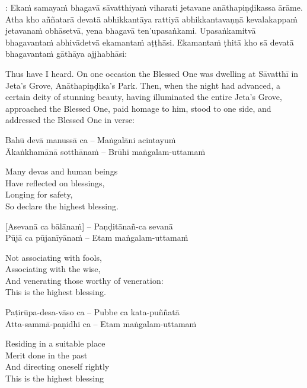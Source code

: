 \begin{pali-hang}
: Ekaṁ samayaṁ bhagavā sāvatthiyaṁ viharati jetavane anāthapiṇḍikassa ārāme. Atha kho aññatarā devatā abhikkantāya rattiyā abhikkantavaṇṇā kevalakappaṁ jetavanaṁ obhāsetvā, yena bhagavā ten'upasaṅkami. Upasaṅkamitvā bhagavantaṁ abhivādetvā ekamantaṁ aṭṭhāsi. Ekamantaṁ ṭhitā kho sā devatā bhagavantaṁ gāthāya ajjhabhāsi:
\end{pali-hang}
\begin{english-hang}
  Thus have I heard. On one occasion the Blessed One was dwelling at Sāvatthī in Jeta's Grove, Anāthapiṇḍika's Park. Then, when the night had advanced, a certain deity of stunning beauty, having illuminated the entire Jeta's Grove, approached the Blessed One, paid homage to him, stood to one side, and addressed the Blessed One in verse:
\end{english-hang}

Bahū devā manussā ca – Maṅgalāni acintayuṁ\\
Ākaṅkhamānā sotthānaṁ – Brūhi maṅgalam-uttamaṁ

\begin{english-verses}
  Many devas and human beings\\
  Have reflected on blessings,\\
  Longing for safety,\\
  So declare the highest blessing.
\end{english-verses}

[Asevanā ca bālānaṁ] – Paṇḍitānañ-ca sevanā\\
Pūjā ca pūjanīyānaṁ – Etam maṅgalam-uttamaṁ

\begin{english-verses}
  Not associating with fools,\\
  Associating with the wise,\\
  And venerating those worthy of veneration:\\
  This is the highest blessing.
\end{english-verses}

Paṭirūpa-desa-vāso ca – Pubbe ca kata-puññatā\\
Atta-sammā-paṇidhi ca – Etam maṅgalam-uttamaṁ

\begin{english-verses}
  Residing in a suitable place\\
  Merit done in the past\\
  And directing oneself rightly\\
  This is the highest blessing
\end{english-verses}

